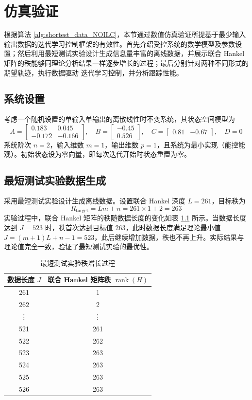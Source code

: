 \chapter{仿真验证}

根据算法 \ref{alg:shortest_data_NOILC}，本节通过数值仿真验证所提基于最少输入输出数据的迭代学习控制框架的有效性。首先介绍受控系统的数学模型及参数设置；然后利用最短测试实验设计生成信息量丰富的离线数据，并展示联合 Hankel 矩阵的秩能够同理论分析结果一样逐步增长的过程；最后分别针对两种不同形式的期望轨迹，执行数据驱动 迭代学习控制，并分析跟踪性能。

\section{系统设置}

考虑一个随机设置的单输入单输出的离散线性时不变系统，其状态空间模型为
\[
A = \begin{bmatrix}
	0.183 & 0.045 \\
	-0.172 & -0.166
\end{bmatrix},\quad
B = \begin{bmatrix}
	-0.45 \\ 0.526
\end{bmatrix},\quad
C = \begin{bmatrix}
	0.81 & -0.67
\end{bmatrix},\quad
D = 0
\]
系统阶次 \(n = 2\)，输入维数 \(m = 1\)，输出维数 \(p = 1\)，且系统为最小实现（能控能观）。初始状态设为零向量，即每次迭代开始时状态重置为零。

\section{最短测试实验数据生成}

采用最短测试实验设计生成离线数据。设置联合 Hankel 深度 \(L = 261\)，目标秩为
\[
R_{\text{target}} = L m + n = 261 \times 1 + 2 = 263
\]
实验过程中，联合 Hankel 矩阵的秩随数据长度的变化如表 \ref{tab:rank_growth} 所示。当数据长度达到 \(J = 523\) 时，秩首次达到目标值 263，此时数据长度满足理论最小值 \(J = (m+1)L + n -1 = 523\)，此后继续增加数据，秩也不再上升。实际结果与理论值完全一致，验证了最短测试实验的最优性。

\begin{table}[htbp]
	\centering
	\caption{最短测试实验秩增长过程}
	\begin{tabular}{c|c}
		\toprule
		数据长度 \(J\) & 联合 Hankel 矩阵秩 \(\operatorname{rank}(H)\) \\
		\midrule
		261 & 1 \\
		262 & 2 \\
		\vdots & \vdots \\
		521 & 261 \\
		522 & 262 \\
		523 & 263 \\
		524 & 263 \\
		525 & 263 \\
		526 & 263 \\
		\bottomrule
	\end{tabular}
	\label{tab:rank_growth}
\end{table}

